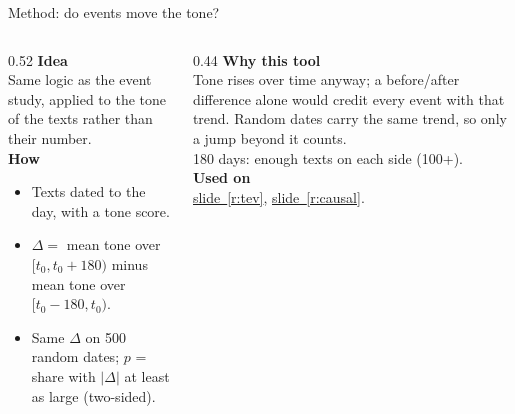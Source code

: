 \documentclass[aspectratio=169,10pt]{beamer}
\newcommand{\usedon}[1]{\hyperref[#1]{\textcolor{c4}{slide~\ref*{#1}}}}
\newcommand{\mhead}[1]{\textcolor{c1}{\textbf{#1}}\\[1pt]}
\begin{document}
\begin{frame}{Method: do events move the tone?}
\begin{columns}[T]
\begin{column}{0.52\textwidth}\footnotesize
\mhead{Idea}
Same logic as the event study, applied to the tone of the texts rather than their number.\\[4pt]
\mhead{How}
\begin{itemize}\setlength\itemsep{1pt}
\item Texts dated to the day, with a tone score.
\item $\Delta = $ mean tone over $[t_0, t_0+180)$ minus mean tone over $[t_0-180, t_0)$.
\item Same $\Delta$ on 500 random dates; $p$ = share with $|\Delta|$ at least as large (two-sided).
\end{itemize}
\end{column}
\begin{column}{0.44\textwidth}\footnotesize
\mhead{Why this tool}
Tone rises over time anyway; a before/after difference alone would credit every event with that trend. Random dates carry the same trend, so only a jump beyond it counts.\\[3pt]
180 days: enough texts on each side (100+).\\[6pt]
\mhead{Used on}
\usedon{r:tev}, \usedon{r:causal}.
\end{column}
\end{columns}
\end{frame}
\end{document}

